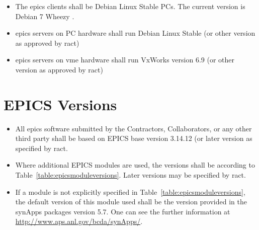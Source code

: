 \documentclass[11pt
  , a4paper
  , article
  , oneside
]{memoir}
\begin{document}
\begin{itemize}
  \item The \Gls{epics} clients shall be Debian Linux Stable PCs. The current version is Debian 7 Wheezy \cite{DEBIAN}. 
  \item \Gls{epics} servers on PC hardware shall run Debian Linux Stable (or other version as approved by \Gls{ract})
  \item \Gls{epics} servers on \Gls{vme} hardware shall run VxWorks version 6.9 (or other version as approved by \Gls{ract})
\end{itemize}


\section{EPICS Versions}
\begin{itemize}
  \item All \Gls{epics} software submitted by the Contractors, Collaborators, or any other third party shall be based on EPICS base version 3.14.12 (or later version as specified by \Gls{ract}.
  \item Where additional EPICS modules are used, the versions shall be according to Table~\ref{table:epicsmoduleversions}. Later versions may be specified by \Gls{ract}.
  \item If a module is not explicitly specified in Table~\ref{table:epicsmoduleversions}, the default version of this module used shall be the version provided in the synApps packages version 5.7. One can see the further information at \url{http://www.aps.anl.gov/bcda/synApps/}.
\end{itemize}
\end{document}
